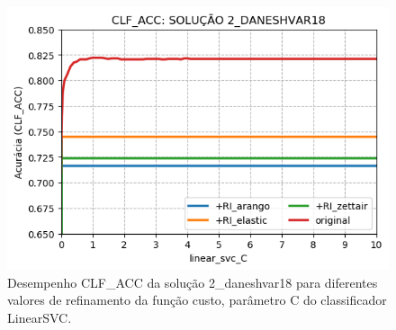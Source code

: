 \begin{figure}[h]
    \centering
    \caption{Desempenho CLF\_ACC da solução 2\_daneshvar18 para diferentes valores de refinamento da função custo, parâmetro C do classificador LinearSVC.}
    \vspace{-0.0cm}
    \begin{center}
        \includegraphics[scale=0.75]{img/clf-acc-2-daneshvar18.png}
    \end{center}
    \vspace{-0.0cm}
    \label{fig:clf-acc-2-daneshvar18}
\end{figure}